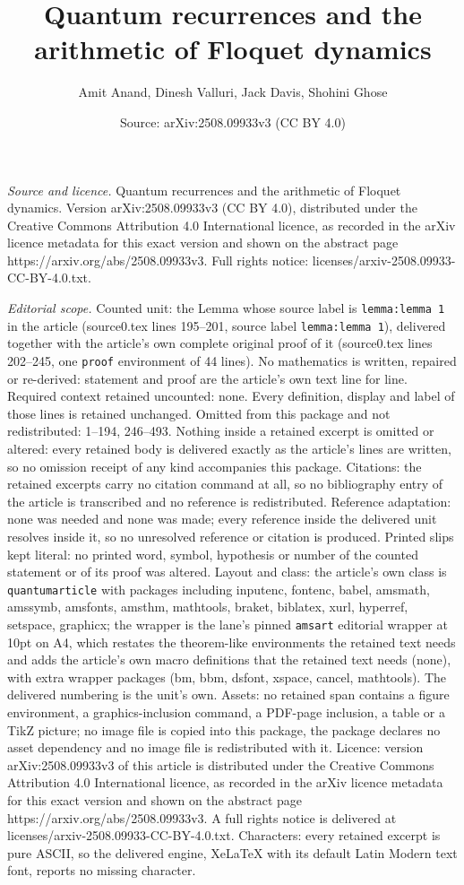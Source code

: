 \documentclass[10pt,a4paper]{amsart}
\title[Quantum recurrences and the arithmetic of Floquet dynamics]{Quantum recurrences and the arithmetic of Floquet dynamics}
\author{Amit Anand, Dinesh Valluri, Jack Davis, Shohini Ghose}
\date{Source: arXiv:2508.09933v3 (CC BY 4.0)}
\begin{document}
\maketitle

\noindent\emph{Source and licence.} Quantum recurrences and the arithmetic of Floquet dynamics. Version arXiv:2508.09933v3 (CC BY 4.0), distributed under the Creative Commons Attribution 4.0 International licence, as recorded in the arXiv licence metadata for this exact version and shown on the abstract page https://arxiv.org/abs/2508.09933v3. Full rights notice: licenses/arxiv-2508.09933-CC-BY-4.0.txt.\par\smallskip

\noindent\textit{Editorial scope.} Counted unit: the Lemma whose source label is \texttt{lemma:lemma 1} in the article (source0.tex lines 195--201, source label \texttt{lemma:lemma 1}), delivered together with the article's own complete original proof of it (source0.tex lines 202--245, one \texttt{proof} environment of 44 lines). No mathematics is written, repaired or re-derived: statement and proof are the article's own text line for line. Required context retained uncounted: none. Every definition, display and label of those lines is retained unchanged. Omitted from this package and not redistributed: 1--194, 246--493. Nothing inside a retained excerpt is omitted or altered: every retained body is delivered exactly as the article's lines are written, so no omission receipt of any kind accompanies this package. Citations: the retained excerpts carry no citation command at all, so no bibliography entry of the article is transcribed and no reference is redistributed. Reference adaptation: none was needed and none was made; every reference inside the delivered unit resolves inside it, so no unresolved reference or citation is produced. Printed slips kept literal: no printed word, symbol, hypothesis or number of the counted statement or of its proof was altered. Layout and class: the article's own class is \texttt{quantumarticle} with packages including inputenc, fontenc, babel, amsmath, amssymb, amsfonts, amsthm, mathtools, braket, biblatex, xurl, hyperref, setspace, graphicx; the wrapper is the lane's pinned \texttt{amsart} editorial wrapper at 10pt on A4, which restates the theorem-like environments the retained text needs and adds the article's own macro definitions that the retained text needs (none), with extra wrapper packages (bm, bbm, dsfont, xspace, cancel, mathtools). The delivered numbering is the unit's own. Assets: no retained span contains a figure environment, a graphics-inclusion command, a PDF-page inclusion, a table or a TikZ picture; no image file is copied into this package, the package declares no asset dependency and no image file is redistributed with it. Licence: version arXiv:2508.09933v3 of this article is distributed under the Creative Commons Attribution 4.0 International licence, as recorded in the arXiv licence metadata for this exact version and shown on the abstract page https://arxiv.org/abs/2508.09933v3. A full rights notice is delivered at licenses/arxiv-2508.09933-CC-BY-4.0.txt. Characters: every retained excerpt is pure ASCII, so the delivered engine, XeLaTeX with its default Latin Modern text font, reports no missing character.
\end{document}
